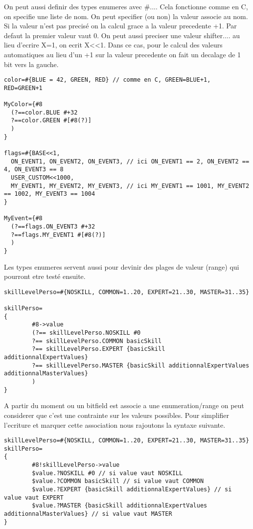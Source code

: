 \documentclass[11pt]{report}
\begin{document}
On peut aussi definir des types enumeres avec \#{...}.
Cela fonctionne comme en C, on specifie une liste de nom.
On peut specifier (ou non) la valeur associe au nom.
Si la valeur n'est pas precisé on la calcul grace a la valeur precedente +1.
Par defaut la premier valeur vaut 0.
On peut aussi preciser une valeur shifter.... 
au lieu d'ecrire X=1, on ecrit X<<1. %
Dans ce cas, pour le calcul des valeurs automatiques au lieu d'un +1 sur la valeur precedente on fait un decalage
de 1 bit vers la gauche.

\begin{lstlisting}
color=#{BLUE = 42, GREEN, RED} // comme en C, GREEN=BLUE+1, RED=GREEN+1

MyColor={#8 
  (?==color.BLUE #+32
  ?==color.GREEN #[#8(?)]
  )
}

flags=#{BASE<<1, 
  ON_EVENT1, ON_EVENT2, ON_EVENT3, // ici ON_EVENT1 == 2, ON_EVENT2 == 4, ON_EVENT3 == 8
  USER_CUSTOM<<1000,
  MY_EVENT1, MY_EVENT2, MY_EVENT3, // ici MY_EVENT1 == 1001, MY_EVENT2 == 1002, MY_EVENT3 == 1004
} 

MyEvent={#8 
  (?==flags.ON_EVENT3 #+32
  ?==flags.MY_EVENT1 #[#8(?)]
  )
}
\end{lstlisting}%

Les types enumeres servent aussi pour devinir des plages de valeur (range) qui pourront etre testé ensuite.

\begin{lstlisting}
skillLevelPerso=#{NOSKILL, COMMON=1..20, EXPERT=21..30, MASTER=31..35}

skillPerso=
{
        #8->value 
        (?== skillLevelPerso.NOSKILL #0
        ?== skillLevelPerso.COMMON basicSkill
        ?== skillLevelPerso.EXPERT {basicSkill additionnalExpertValues}
        ?== skillLevelPerso.MASTER {basicSkill additionnalExpertValues additionnalMasterValues}
        )
}
\end{lstlisting}

A partir du moment ou un bitfield est associe a une enumeration/range on peut considerer que c'est une contrainte sur
les valeurs possibles. Pour simplifier l'ecriture et marquer cette association nous rajoutons la syntaxe suivante.
 
\begin{lstlisting}
skillLevelPerso=#{NOSKILL, COMMON=1..20, EXPERT=21..30, MASTER=31..35}
skillPerso=
{
        #8!skillLevelPerso->value 
        $value.?NOSKILL #0 // si value vaut NOSKILL 
        $value.?COMMON basicSkill // si value vaut COMMON 
        $value.?EXPERT {basicSkill additionnalExpertValues} // si value vaut EXPERT 
        $value.?MASTER {basicSkill additionnalExpertValues additionnalMasterValues} // si value vaut MASTER        
}
\end{lstlisting} %
\end{document}
